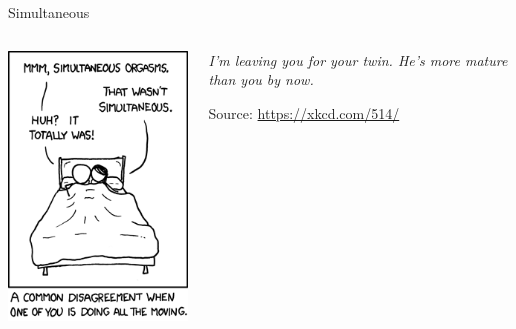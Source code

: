 
\begin{frame}[t,plain]
\titlepage
\end{frame}


\begin{frame}{Simultaneous}
%
\begin{columns}[T]
\vspace{-12pt}
\begin{center}
	\includegraphics[width=.6\linewidth]{./gfx/09-xkcd-simultaneous}
\end{center}
%
\vspace{+40pt}
\begin{center}
	\emph{I'm leaving you for your twin. He's more mature than you by now.}
	
	\vspace{12pt}
	Source: \url{https://xkcd.com/514/}
\end{center}
\end{columns}
%
\end{frame}


